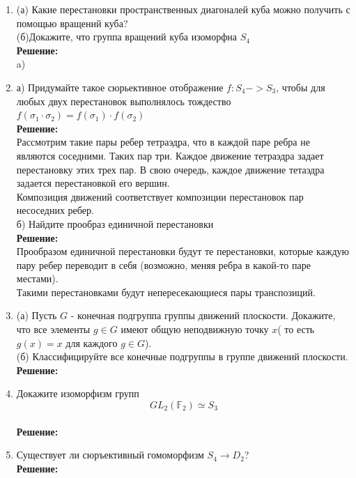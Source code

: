 \documentclass[]{book}
\theoremstyle{definition}
\newcommand{\bb}[1]{\mathbb{#1}}
\begin{document}
\begin{enumerate}[resume]
\item (а) Какие перестановки пространственных диагоналей куба можно получить с помощью вращений куба?\\
(б)Докажите, что группа вращений куба изоморфна $S_4$\\
\textbf{Решение:}\\
a) 





\item
а) Придумайте такое сюрьективное отображение $f:S_4->S_3$, чтобы для любых двух перестановок выполнялось тождество $f({\sigma_1}\cdot{\sigma_2})={f(\sigma_1)}\cdot{f(\sigma_2)}$\\
\textbf{Решение:}\\
Рассмотрим такие пары ребер тетраэдра, что в каждой паре ребра не являются соседними. Таких пар три. Каждое движение тетраэдра задает перестановку этих трех пар. В свою очередь, каждое движение тетаэдра задается перестановкой его вершин. \\
Композиция движений соответствует композиции перестановок пар несоседних ребер.\\
б) Найдите прообраз единичной перестановки\\
\textbf{Решение:}\\
Прообразом единичной перестановки будут те перестановки, которые каждую пару ребер переводит в себя (возможно, меняя ребра в какой-то паре местами).\\
Такими перестановками будут непересекающиеся пары транспозиций.




\item (а) Пусть $G$ - конечная подгруппа группы движений плоскости. Докажите, что все элементы $g\in G$ имеют общую неподвижную точку $x$( то есть $g(x) = x$ для каждого $g\in G$).\\
(б) Классифицируйте все конечные подгруппы в группе движений плоскости.\\
\textbf{Решение:}





\item Докажите изоморфизм групп 
$$GL_2({\bb{F}}_{2})\simeq S_3$$\\
\textbf{Решение:}

\item Существует ли сюръективный гомоморфизм $S_4 \longrightarrow D_2$?\\
\textbf{Решение:}


\end{enumerate}
\end{document}
